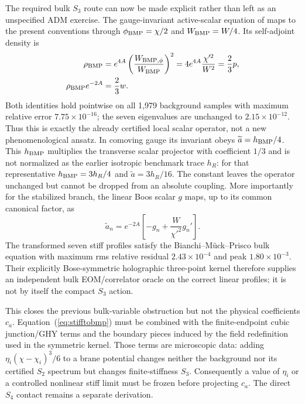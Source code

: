 \documentclass[10pt]{article}
\begin{document}
The required bulk $S_3$ route can now be made explicit rather than left as an
unspecified ADM exercise.  The gauge-invariant active-scalar equation of
\citet{Bianchi2003} maps to the present conventions through
$\phi_{\rm BMP}=\chi/2$ and $W_{\rm BMP}=W/4$.  Its self-adjoint density is
\begin{equation}
 \begin{aligned}
  \rho_{\rm BMP}&=e^{4A}\left(\frac{W_{{\rm BMP},\phi}}
  {W_{\rm BMP}}\right)^2
  =4e^{4A}\frac{\chi'^2}{W^2}=\frac23p,\\
  \rho_{\rm BMP}e^{-2A}&=\frac23w .
 \end{aligned}
 \label{eq:bmpoperatormatch}
\end{equation}
Both identities hold pointwise on all 1,979 background samples with maximum
relative error $7.75\times10^{-16}$; the seven eigenvalues are unchanged to
$2.15\times10^{-12}$.  Thus this is exactly the already certified local scalar
operator, not a new phenomenological ansatz.  In comoving gauge its invariant
obeys $\widetilde a=h_{\rm BMP}/4$.  This $h_{\rm BMP}$ multiplies the
transverse scalar projector with coefficient $1/3$ and is not normalized as
the earlier isotropic benchmark trace $h_R$: for that representative
$h_{\rm BMP}=3h_R/4$ and $\widetilde a=3h_R/16$.  The constant leaves the
operator unchanged but cannot be dropped from an absolute coupling.  More
importantly for the stabilized branch, the linear Boos scalar $g$ maps, up to
its common canonical factor, as
\begin{equation}
 \widetilde a_n=e^{-2A}\left[-g_n+\frac{W}{\chi'^2}g_n'\right].
 \label{eq:stifftobmp}
\end{equation}
The transformed seven stiff profiles satisfy the Bianchi--M\"uck--Prisco bulk
equation with maximum rms relative residual $2.43\times10^{-4}$ and peak
$1.80\times10^{-3}$.  Their explicitly Bose-symmetric holographic three-point
kernel therefore supplies an independent bulk EOM/correlator oracle on the
correct linear profiles; it is not by itself the compact $S_3$ action.

This closes the previous bulk-variable obstruction but not the physical
coefficients $c_a$.  Equation~(\ref{eq:stifftobmp}) must be combined with the
finite-endpoint cubic junction/GHY terms and the boundary pieces induced by the
field redefinition used in the symmetric kernel.  Those terms are microscopic
data: adding $\eta_i(\chi-\chi_i)^3/6$ to a brane potential changes neither the
background nor its certified $S_2$ spectrum but changes finite-stiffness $S_3$.
Consequently a value of $\eta_i$ or a controlled nonlinear stiff limit must be
frozen before projecting $c_a$.  The direct $S_4$ contact remains a separate
derivation.
\end{document}
